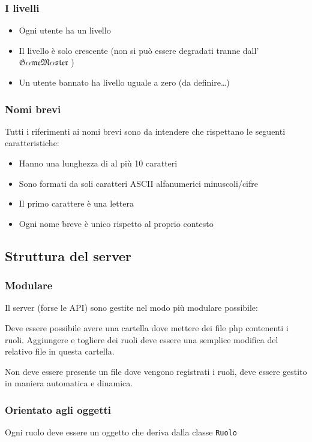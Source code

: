 \documentclass[10pt,a4paper]{article}
\newcommand{\GameMaster}{
$\mathfrak{G\alpha me}
\allowbreak \mathfrak{M\alpha ster}$
}
\begin{document}
\subsubsection{I livelli}
\begin{itemize}
\item Ogni utente ha un livello
\item Il livello è solo crescente (non si può essere degradati tranne dall'\GameMaster)
\item Un utente bannato ha livello uguale a zero (da definire\dots)
\end{itemize}

\subsubsection{Nomi brevi}
Tutti i riferimenti ai nomi brevi sono da intendere che rispettano le seguenti caratteristiche:
\begin{itemize}
\item Hanno una lunghezza di al più 10 caratteri
\item Sono formati da soli caratteri ASCII alfanumerici minuscoli/cifre
\item Il primo carattere è una lettera
\item Ogni nome breve è unico rispetto al proprio contesto
\end{itemize}

\subsection{Struttura del server}
\subsubsection*{Modulare}
Il server (forse le API) sono gestite nel modo più modulare possibile:

Deve essere possibile avere una cartella dove mettere dei file php contenenti i ruoli. Aggiungere e togliere dei ruoli deve essere una semplice modifica del relativo file in questa cartella. 

Non deve essere presente un file dove vengono registrati i ruoli, deve essere gestito in maniera automatica e dinamica.

\subsubsection*{Orientato agli oggetti}
Ogni ruolo deve essere un oggetto che deriva dalla classe \texttt{Ruolo}
\end{document}
